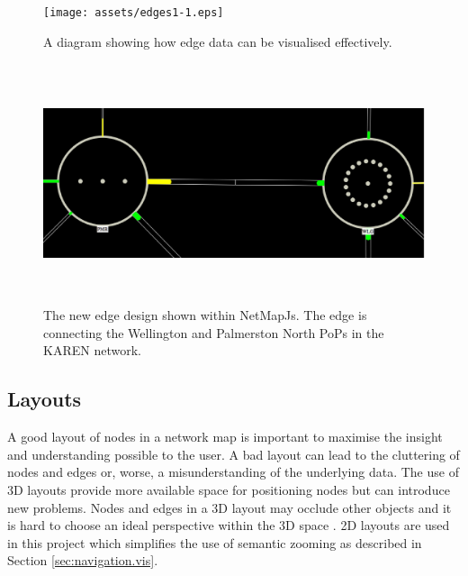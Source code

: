 \documentclass[11pt, a4paper]{article}
\begin{document}
\begin{figure}
\centering
\texttt{[image: assets/edges1-1.eps]}
\caption{A diagram showing how edge data can be visualised effectively.}
\label{fig:edges1.1}
\end{figure}

\begin{figure}
\centering
\includegraphics[width=170mm,height=70.21mm]{assets/edges1-2.eps}
\caption{The new edge design shown within NetMapJs. The edge is connecting the
Wellington and Palmerston North PoPs in the KAREN network.}
\label{fig:edges1.2}
\end{figure}

\subsection{Layouts}
\label{sec:layouts.vis}

% 

% 

A good layout of nodes in a network map is important to maximise the insight and
understanding possible to the user. A bad layout can lead to the cluttering of
nodes and edges or, worse, a misunderstanding of the underlying data. The use of
3D layouts provide more available space for positioning nodes but can introduce
new problems. Nodes and edges in a 3D layout may occlude other objects and it is
hard to choose an ideal perspective within the 3D space \cite{Lai_1998}. 2D
layouts are used in this project which simplifies the use of semantic zooming as
described in Section \ref{sec:navigation.vis}. 
\end{document}
